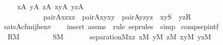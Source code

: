 \begin{isabellebody}
\ \ \isanewline
\ \ \ \ {\isachardoublequoteopen}{\isacharparenleft}{\kern0pt}{\isasymexists}x{\isasymin}A{\isachardot}{\kern0pt}\ {\isasymexists}y{\isasymin}A{\isachardot}{\kern0pt}\ {\isasymexists}z{\isasymin}A{\isachardot}{\kern0pt}\ {\isasymexists}xy{\isasymin}A{\isachardot}{\kern0pt}\ {\isasymexists}yz{\isasymin}A{\isachardot}{\kern0pt}\isanewline
\ \ \ \ \ \ \ \ \ \ \ \ \ \ pair{\isacharparenleft}{\kern0pt}{\isacharhash}{\kern0pt}{\isacharhash}{\kern0pt}A{\isacharcomma}{\kern0pt}x{\isacharcomma}{\kern0pt}z{\isacharcomma}{\kern0pt}xz{\isacharparenright}{\kern0pt}\ {\isacharampersand}{\kern0pt}\ pair{\isacharparenleft}{\kern0pt}{\isacharhash}{\kern0pt}{\isacharhash}{\kern0pt}A{\isacharcomma}{\kern0pt}x{\isacharcomma}{\kern0pt}y{\isacharcomma}{\kern0pt}xy{\isacharparenright}{\kern0pt}\ {\isacharampersand}{\kern0pt}\ pair{\isacharparenleft}{\kern0pt}{\isacharhash}{\kern0pt}{\isacharhash}{\kern0pt}A{\isacharcomma}{\kern0pt}y{\isacharcomma}{\kern0pt}z{\isacharcomma}{\kern0pt}yz{\isacharparenright}{\kern0pt}\ {\isacharampersand}{\kern0pt}\ xy{\isasymin}S\ {\isacharampersand}{\kern0pt}\ yz{\isasymin}R{\isacharparenright}{\kern0pt}\isanewline
\ \ {\isasymlongleftrightarrow}\ sats{\isacharparenleft}{\kern0pt}A{\isacharcomma}{\kern0pt}{\isacharquery}{\kern0pt}cfm{\isacharparenleft}{\kern0pt}i{\isacharcomma}{\kern0pt}j{\isacharcomma}{\kern0pt}h{\isacharparenright}{\kern0pt}{\isacharcomma}{\kern0pt}env{\isacharparenright}{\kern0pt}{\isachardoublequoteclose}\isanewline
%
\isadelimproof
\ \ %
\endisadelimproof
%
\isatagproof
{}\isamarkupfalse%
\ {\isacharparenleft}{\kern0pt}insert\ assms\ {\isacharsemicolon}{\kern0pt}\ {\isacharparenleft}{\kern0pt}rule\ sep{\isacharunderscore}{\kern0pt}rules\ {\isacharbar}{\kern0pt}\ simp{\isacharparenright}{\kern0pt}{\isacharplus}{\kern0pt}{\isacharparenright}{\kern0pt}%
\endisatagproof
{\isafoldproof}%
%
\isadelimproof
\isanewline
%
\endisadelimproof
\isanewline
\isanewline
{}\isamarkupfalse%
\ comp{\isacharunderscore}{\kern0pt}sep{\isacharunderscore}{\kern0pt}intf\ {\isacharcolon}{\kern0pt}\isanewline
\ \ \isanewline
\ \ \ \ {\isachardoublequoteopen}R{\isasymin}M{\isachardoublequoteclose}\isanewline
\ \ \ \ \isanewline
\ \ \ \ {\isachardoublequoteopen}S{\isasymin}M{\isachardoublequoteclose}\isanewline
\ \ \isanewline
\ \ \ \ {\isachardoublequoteopen}separation{\isacharparenleft}{\kern0pt}{\isacharhash}{\kern0pt}{\isacharhash}{\kern0pt}M{\isacharcomma}{\kern0pt}{\isasymlambda}xz{\isachardot}{\kern0pt}\ {\isasymexists}x{\isasymin}M{\isachardot}{\kern0pt}\ {\isasymexists}y{\isasymin}M{\isachardot}{\kern0pt}\ {\isasymexists}z{\isasymin}M{\isachardot}{\kern0pt}\ {\isasymexists}xy{\isasymin}M{\isachardot}{\kern0pt}\ {\isasymexists}yz{\isasymin}M{\isachardot}{\kern0pt}\isanewline

\end{isabellebody}
